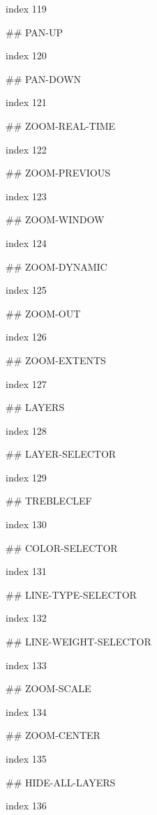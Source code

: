 index 119



## PAN-UP

index 120



## PAN-DOWN

index 121



## ZOOM-REAL-TIME

index 122



## ZOOM-PREVIOUS

index 123



## ZOOM-WINDOW

index 124



## ZOOM-DYNAMIC

index 125



## ZOOM-OUT

index 126



## ZOOM-EXTENTS

index 127



## LAYERS

index 128



## LAYER-SELECTOR

index 129



## TREBLECLEF

index 130



## COLOR-SELECTOR

index 131



## LINE-TYPE-SELECTOR

index 132



## LINE-WEIGHT-SELECTOR

index 133



## ZOOM-SCALE

index 134



## ZOOM-CENTER

index 135



## HIDE-ALL-LAYERS

index 136



